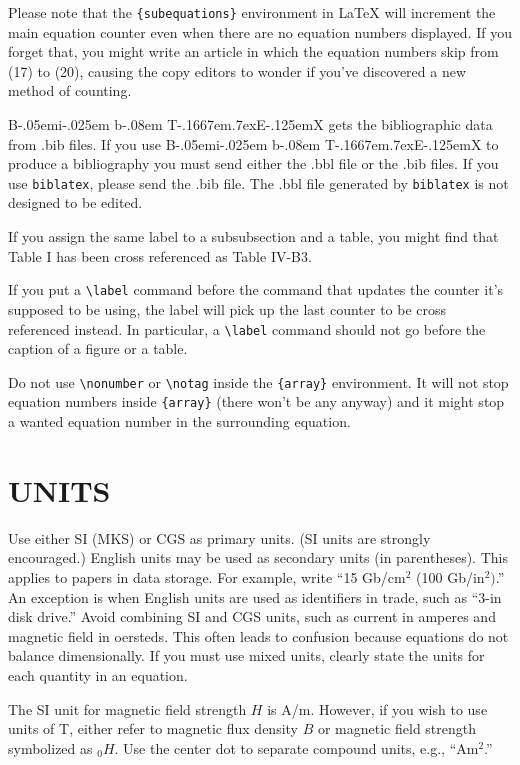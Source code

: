 \documentclass{ieeetmlcn}
\def\BibTeX{{\rm B\kern-.05em{\sc i\kern-.025em b}\kern-.08em
    T\kern-.1667em\lower.7ex\hbox{E}\kern-.125emX}}
\begin{document}
Please note that the \verb|{subequations}| environment in {\LaTeX}
will increment the main equation counter even when there are no
equation numbers displayed. If you forget that, you might write an
article in which the equation numbers skip from (17) to (20), causing
the copy editors to wonder if you've discovered a new method of
counting.

{\BibTeX} gets the bibliographic data from .bib files. If you use {\BibTeX} to produce a
bibliography you must send either the .bbl file or the .bib files.
If you use \texttt{biblatex}, please send the .bib file. The .bbl file
generated by \texttt{biblatex} is not designed to be edited.

If you assign the same label to a
subsubsection and a table, you might find that Table I has been cross
referenced as Table IV-B3.

If you put a
\verb|\label| command before the command that updates the counter it's
supposed to be using, the label will pick up the last counter to be
cross referenced instead. In particular, a \verb|\label| command
should not go before the caption of a figure or a table.

Do not use \verb|\nonumber| or \verb|\notag| inside the \verb|{array}| environment. It
will not stop equation numbers inside \verb|{array}| (there won't be
any anyway) and it might stop a wanted equation number in the
surrounding equation.

\section{UNITS}
Use either SI (MKS) or CGS as primary units. (SI units are strongly
encouraged.) English units may be used as secondary units (in parentheses).
This applies to papers in data storage. For example, write ``15 Gb/cm$^{2}$
(100 Gb/in$^{2})$.'' An exception is when English units are used as
identifiers in trade, such as ``3\textonehalf -in disk drive.'' Avoid
combining SI and CGS units, such as current in amperes and magnetic field in
oersteds. This often leads to confusion because equations do not balance
dimensionally. If you must use mixed units, clearly state the units for each
quantity in an equation.

The SI unit for magnetic field strength $H$ is A/m. However, if you wish to use
units of T, either refer to magnetic flux density $B$ or magnetic field
strength symbolized as \textmu $_{0}H$. Use the center dot to separate
compound units, e.g., ``A\textbullet m$^{2}$.''
\end{document}
